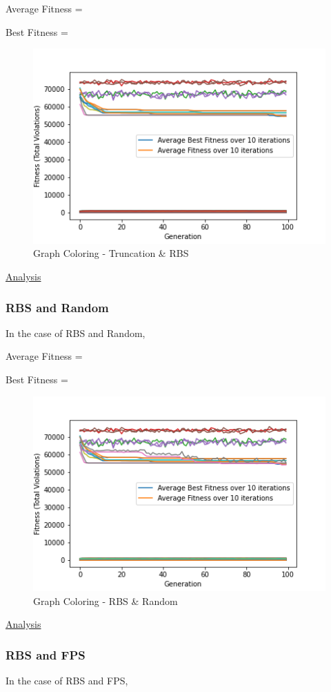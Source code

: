 \documentclass[11pt, letterpaper]{article}
\begin{document}
Average Fitness = 

Best Fitness = 
\begin{figure}[H]
    \centering
    \includegraphics[scale = 0.6]{images/graphcoloring_tr_rb.png}
    \caption {Graph Coloring - Truncation \& RBS}
    \label {fig:gcTR}
\end{figure}

\underline{Analysis}
\subsubsection {RBS and Random}
In the case of RBS and Random,

Average Fitness = 

Best Fitness = 
\begin{figure}[H]
    \centering
    \includegraphics[scale = 0.6]{images/graphcoloring_rb_rd.png}
    \caption {Graph Coloring - RBS \& Random}
    \label {fig:gcRbR}
\end{figure}

\underline{Analysis}

\subsubsection {RBS and FPS}
In the case of RBS and FPS,
\end{document}
